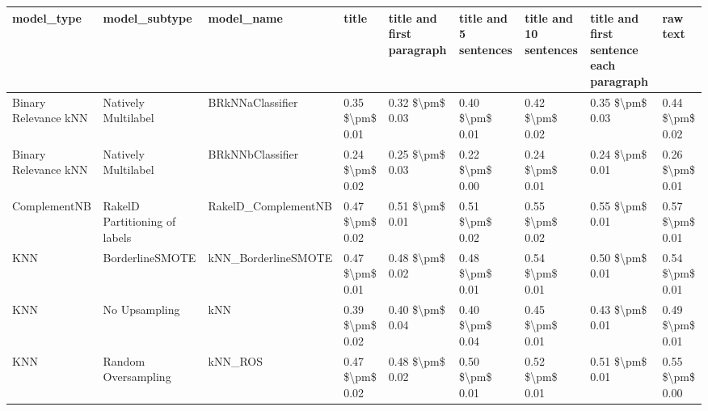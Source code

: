 \begin{tabular}{lllllllll}
\toprule
                     model\_type &                 model\_subtype &                                   model\_name &           title & title and first paragraph & title and 5 sentences & title and 10 sentences & title and first sentence each paragraph &            raw text \\
\midrule
           Binary Relevance kNN &           Natively Multilabel &                             BRkNNaClassifier & 0.35 \$\textbackslash pm\$ 0.01 &           0.32 \$\textbackslash pm\$ 0.03 &       0.40 \$\textbackslash pm\$ 0.01 &        0.42 \$\textbackslash pm\$ 0.02 &                         0.35 \$\textbackslash pm\$ 0.03 &     0.44 \$\textbackslash pm\$ 0.02 \\
           Binary Relevance kNN &           Natively Multilabel &                             BRkNNbClassifier & 0.24 \$\textbackslash pm\$ 0.02 &           0.25 \$\textbackslash pm\$ 0.03 &       0.22 \$\textbackslash pm\$ 0.00 &        0.24 \$\textbackslash pm\$ 0.01 &                         0.24 \$\textbackslash pm\$ 0.01 &     0.26 \$\textbackslash pm\$ 0.01 \\
                   ComplementNB & RakelD Partitioning of labels &                          RakelD\_ComplementNB & 0.47 \$\textbackslash pm\$ 0.02 &           0.51 \$\textbackslash pm\$ 0.01 &       0.51 \$\textbackslash pm\$ 0.02 &        0.55 \$\textbackslash pm\$ 0.02 &                         0.55 \$\textbackslash pm\$ 0.01 &     0.57 \$\textbackslash pm\$ 0.01 \\
                            KNN &               BorderlineSMOTE &                          kNN\_BorderlineSMOTE & 0.47 \$\textbackslash pm\$ 0.01 &           0.48 \$\textbackslash pm\$ 0.02 &       0.48 \$\textbackslash pm\$ 0.01 &        0.54 \$\textbackslash pm\$ 0.01 &                         0.50 \$\textbackslash pm\$ 0.01 &     0.54 \$\textbackslash pm\$ 0.01 \\
                            KNN &                 No Upsampling &                                          kNN & 0.39 \$\textbackslash pm\$ 0.02 &           0.40 \$\textbackslash pm\$ 0.04 &       0.40 \$\textbackslash pm\$ 0.04 &        0.45 \$\textbackslash pm\$ 0.01 &                         0.43 \$\textbackslash pm\$ 0.01 &     0.49 \$\textbackslash pm\$ 0.01 \\
                            KNN &           Random Oversampling &                                      kNN\_ROS & 0.47 \$\textbackslash pm\$ 0.02 &           0.48 \$\textbackslash pm\$ 0.02 &       0.50 \$\textbackslash pm\$ 0.01 &        0.52 \$\textbackslash pm\$ 0.01 &                         0.51 \$\textbackslash pm\$ 0.01 &     0.55 \$\textbackslash pm\$ 0.00 \\

\end{tabular}

